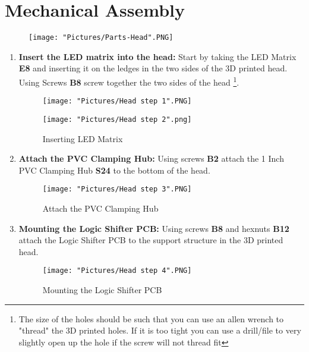 \documentclass[12pt]{article}
\begin{document}
\section{Mechanical Assembly}

\begin{figure}[H]
	\centering
	\texttt{[image: "Pictures/Parts-Head".PNG]}
\end{figure}

\begin{enumerate}

	\item \textbf{Insert the LED matrix into the head:} Start by taking the LED Matrix \textbf{E8} and inserting it on the ledges in the two sides of the 3D printed head. Using Screws \textbf{B8} screw together the two sides of the head \footnote{The size of the holes should be such that you can use an allen wrench to "thread" the 3D printed holes. If it is too tight you can use a drill/file to very slightly open up the hole if the screw will not thread fit}.


\begin{figure}[H]
	\centering
  	\begin{minipage}[b]{0.45\textwidth}
		\texttt{[image: "Pictures/Head step 1".PNG]}
  	\end{minipage}
  	\hfill
  	\begin{minipage}[b]{0.45\textwidth}
    		\texttt{[image: "Pictures/Head step 2".png]}
  	\end{minipage}
  	\caption{Inserting LED Matrix}
  	\label{LED}
\end{figure}

	\item \textbf{Attach the PVC  Clamping Hub:} Using screws \textbf{B2} attach the 1 Inch PVC Clamping Hub \textbf{S24} to the bottom of the head. 

\begin{figure}[H]
	\centering
	\texttt{[image: "Pictures/Head step 3".PNG]}
	\caption{Attach the PVC Clamping Hub}
\end{figure}

	\item \textbf{Mounting the Logic Shifter PCB:} Using screws \textbf{B8} and hexnuts \textbf{B12} attach the Logic Shifter PCB to the support structure in the 3D printed head. 

\begin{figure}[H]
	\centering
	\texttt{[image: "Pictures/Head step 4".PNG]}
	\caption{Mounting the Logic Shifter PCB}
\end{figure}


\end{enumerate}
\end{document}
